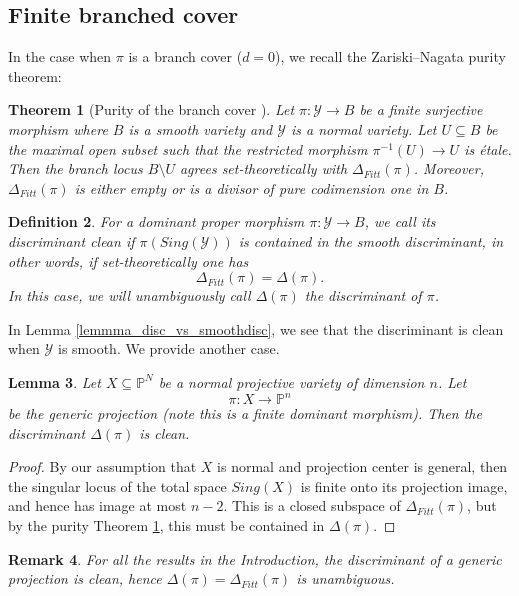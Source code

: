 \documentclass[12pt]{amsart}
\newtheorem{theorem}{Theorem}[section]
\newtheorem{definition}[theorem]{Definition}
\newtheorem{lemma}[theorem]{Lemma}
\newtheorem{remark}[theorem]{Remark}
\begin{document}
\subsection{Finite branched cover}
In the case when $\pi$ is a branch cover ($d=0$), we recall the Zariski--Nagata purity theorem:
\begin{theorem}[Purity of the branch cover \cite{Zariski-purity,Nagata-purity}]\label{thm_Zariski-Nagata}
  Let $\pi: \mathcal{Y} \to B$ be a finite surjective morphism where $B$ is a smooth variety and $\mathcal{Y}$ is a normal variety. Let $U \subseteq B$ be the maximal open subset such that the restricted morphism $\pi^{-1}(U) \to U$ is étale. Then the branch locus $B\setminus U$ agrees set-theoretically with $\Delta_{Fitt}(\pi)$. Moreover, $\Delta_{Fitt}(\pi)$ is either empty or is a divisor of pure codimension one in $B$.
\end{theorem}


\begin{definition}\normalfont
    For a dominant proper morphism $\pi:\mathcal Y\to B$, we call its discriminant \textit{clean} if $\pi(Sing(\mathcal Y))$ is contained in the smooth discriminant, in other words, if set-theoretically one has
    $$\Delta_{Fitt}(\pi)=\Delta(\pi).$$
In this case, we will unambiguously call $\Delta(\pi)$ the discriminant of $\pi$.
\end{definition}
In Lemma \ref{lemmma_disc_vs_smoothdisc}, we see that the discriminant is clean when $\mathcal Y$ is smooth. We provide another case.
\begin{lemma}\label{lemma_finite-clean}
   Let $X\subseteq \mathbb P^N$ be a normal projective variety of dimension $n$. Let $$\pi:X\to \mathbb P^n$$ be the generic projection (note this is a finite dominant morphism). Then the discriminant $\Delta(\pi)$ is clean.
\end{lemma}
\begin{proof}
   By our assumption that $X$ is normal and projection center is general, then the singular locus of the total space $Sing(X)$ is finite onto its projection image, and hence has image at most $n-2$. This is a closed subspace of $\Delta_{Fitt}(\pi)$, but by the purity Theorem \ref{thm_Zariski-Nagata}, this must be contained in $\Delta(\pi)$.
\end{proof}

\begin{remark}\normalfont
   For all the results in the Introduction, the discriminant of a generic projection is clean, hence $\Delta(\pi)=\Delta_{Fitt}(\pi)$ is unambiguous. 
\end{remark}
\end{document}

